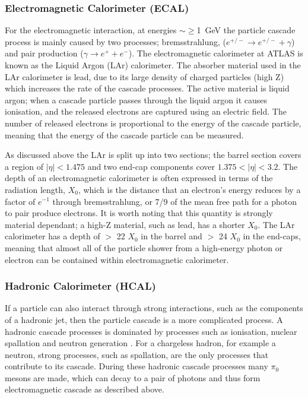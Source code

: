 \subsubsection{Electromagnetic Calorimeter (ECAL)}

For the electromagnetic interaction, at energies $\sim \geq$\SI{1}{\GeV} the particle cascade process is mainly caused by two processes;
bremsstrahlung, ($e^{+/-} \to e^{+/-} + \gamma$) and pair production ($\gamma \to e^{+} + e^{-}$).
The electromagnetic calorimeter at ATLAS is known as the Liquid Argon (LAr) calorimeter.
The absorber material used in the LAr calorimeter is lead, due to its large density of charged particles (high Z)
which increases the rate of the cascade processes.
The active material is liquid argon;
when a cascade particle passes through the liquid argon it causes ionisation,
and the released electrons are captured using an electric field.
The number of released electrons is proportional to the energy of the cascade particle,
meaning that the energy of the cascade particle can be measured. 

As discussed above the LAr is split up into two sections;
the barrel section covers a region of $|\eta| < 1.475$ and two end-cap components cover $1.375 < |\eta| < 3.2$.
The depth of an electromagnetic calorimeter is often expressed in terms of the radiation length, $X_{0}$,
which is the distance that an electron's energy reduces by a factor of $e^{-1}$ through bremsstrahlung,
or 7/9 of the mean free path for a photon to pair produce electrons.
It is worth noting that this quantity is strongly material dependant;
a high-Z material, such as lead, has a shorter $X_0$.
The LAr calorimeter has a depth of $>$ 22 $X_{0}$ in the barrel and $>$ 24 $X_{0}$ in the end-caps,
meaning that almost all of the particle shower from a high-energy photon
or electron can be contained within electromagnetic calorimeter. 

\subsubsection{Hadronic Calorimeter (HCAL)}
\label{sec:det-calo_HCAL}

If a particle can also interact through strong interactions, such as the components of a hadronic jet,
then the particle cascade is a more complicated process.
A hadronic cascade processes is dominated by processes such as
ionisation, nuclear spallation and neutron generation \cite{det-nuclearInt_book, det-thesis_kate}.
For a chargeless hadron, for example a neutron,
strong processes, such as spallation, are the only processes that contribute to its cascade.
During these hadronic cascade processes many $\pi_0$ mesons are made,
which can decay to a pair of photons and thus form electromagnetic cascade as described above. 

